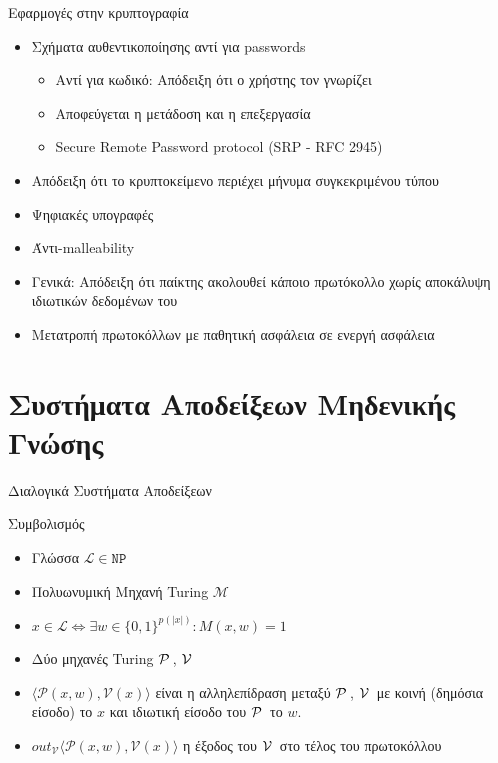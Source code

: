 \documentclass[10pt,handout]{beamer}
\begin{document}
\begin{frame}{Εφαρμογές στην κρυπτογραφία}
\begin{itemize}
\item Σχήματα αυθεντικοποίησης αντί για passwords
\begin{itemize}
\item Αντί για κωδικό: Απόδειξη ότι ο χρήστης τον γνωρίζει
\item Αποφεύγεται η μετάδοση και η επεξεργασία
\item Secure Remote Password protocol (SRP  - RFC 2945)
\end{itemize}
\pause
\item Απόδειξη ότι το κρυπτοκείμενο περιέχει μήνυμα συγκεκριμένου τύπου
\pause
\item Ψηφιακές υπογραφές
\item Άντι-malleability
\pause 
\item Γενικά: Απόδειξη ότι παίκτης ακολουθεί κάποιο πρωτόκολλο χωρίς αποκάλυψη ιδιωτικών δεδομένων του
\item Μετατροπή πρωτοκόλλων με παθητική ασφάλεια σε ενεργή ασφάλεια
\end{itemize}
\end{frame}

\section{Συστήματα Αποδείξεων Μηδενικής Γνώσης}
\begin{frame}{Διαλογικά Συστήματα Αποδείξεων}
\begin{block}{Συμβολισμός}
\begin{itemize}
\item Γλώσσα $ \mathcal{L} \in \mathtt{NP}$ \pause
\item Πολυωνυμική Mηχανή Turing $\mathcal{M}$ \pause
\item $x \in \mathcal{L} \Leftrightarrow \exists w \in \{0,1\}^{p(|x|)}: M(x,w) = 1$ \pause
\item Δύο μηχανές Turing  $\mathcal{P}\,$, $\mathcal{V}\,$ \pause
\item $\langle \mathcal{P}(x,w), \mathcal{V}(x) \rangle$ είναι η αλληλεπίδραση μεταξύ  $\mathcal{P}\,$, $\mathcal{V}\,$ με κοινή (δημόσια είσοδο) το $x$ και ιδιωτική είσοδο του $\mathcal{P}\,$ το $w$. \pause
\item $out_\mathcal{V}{\langle \mathcal{P}(x,w), \mathcal{V}(x) \rangle}$ η έξοδος του $\mathcal{V}\,$ στο τέλος του πρωτοκόλλου
\end{itemize}
\end{block}
\end{frame}
\end{document}
